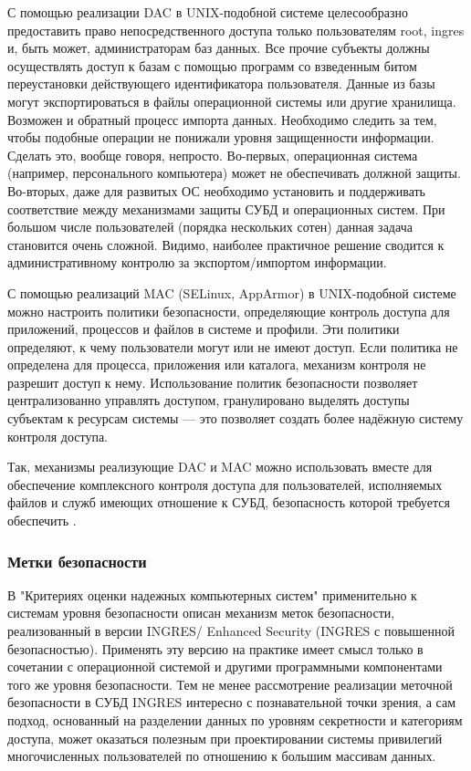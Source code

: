 С помощью реализации DAC в UNIX-подобной системе целесообразно предоставить право непосредственного доступа
только пользователям root, ingres и, быть может, администраторам баз данных. Все прочие
субъекты должны осуществлять доступ к базам с помощью программ со взведенным битом переустановки
действующего идентификатора пользователя.
Данные из базы могут экспортироваться в файлы операционной системы или другие хранилища. Возможен и
обратный процесс импорта данных. Необходимо следить за тем, чтобы подобные операции не понижали
уровня защищенности информации. Сделать это, вообще говоря, непросто. Во-первых, операционная
система (например, персонального компьютера) может не обеспечивать должной защиты. Во-вторых, даже
для развитых ОС необходимо установить и поддерживать соответствие между механизмами защиты СУБД и
операционных систем. При большом числе пользователей (порядка нескольких сотен) данная задача
становится очень сложной. Видимо, наиболее практичное решение сводится к административному контролю
за экспортом/импортом информации.

С помощью реализаций MAC (SELinux, AppArmor) в UNIX-подобной системе можно настроить политики безопасности,
определяющие контроль доступа для приложений, процессов и файлов в системе и профили. Эти политики
определяют, к чему пользователи могут или не имеют доступ. Если политика не определена для процесса,
приложения или каталога, механизм контроля не разрешит доступ к нему.
Использование политик безопасности позволяет централизованно управлять доступом, гранулировано
выделять доступы субъектам к ресурсам системы — это позволяет создать более надёжную систему
контроля доступа.

Так, механизмы реализующие DAC и MAC можно использовать вместе для обеспечение комплексного контроля доступа
для пользователей, исполняемых файлов и служб имеющих отношение к СУБД, безопасность которой требуется
обеспечить \cite{selinux-apparmor}.


\subsubsection{Метки безопасности}

В "Критериях оценки надежных компьютерных систем" применительно к системам уровня безопасности
описан механизм меток безопасности, реализованный в версии INGRES/ Enhanced Security (INGRES с
повышенной безопасностью). Применять эту версию на практике имеет смысл только в сочетании с
операционной системой и другими программными компонентами того же уровня безопасности. Тем не менее
рассмотрение реализации меточной безопасности в СУБД INGRES интересно с познавательной точки
зрения, а сам подход, основанный на разделении данных по уровням секретности и категориям доступа,
может оказаться полезным при проектировании системы привилегий многочисленных пользователей по
отношению к большим массивам данных.

